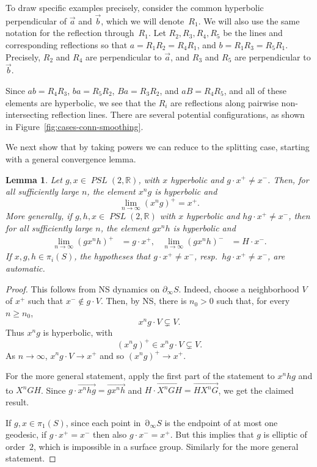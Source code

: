 \documentclass[11pt]{amsart}
\newcommand{\ora}[1]{\overrightarrow{#1}}
\numberwithin{equation}{section}
\numberwithin{figure}{section}
\newtheorem{lemma}[theorem]{Lemma}
\theoremstyle{definition}
\theoremstyle{plain}
\newcommand\bbR{\ensuremath{\mathbb{R}}}
\DeclareMathOperator{\bdy}{\partial}
\DeclareMathOperator{\PSL}{\mathit{PSL}}
\begin{document}
To draw specific examples precisely, consider the common hyperbolic perpendicular of $\ora{a}$
and $\ora{b}$, which we will denote~$R_1$. We will also use the
same notation for the reflection through~$R_1$.
Let $R_2, R_3, R_4, R_5$ be the lines and corresponding reflections so
that $a=R_1 R_2 = R_4 R_1$, and $b=R_1 R_3 = R_5 R_1$. Precisely,
$R_2$ and $R_4$ are perpendicular to $\ora{a}$, and $R_3$ and $R_5$
are perpendicular to $\ora{b}$.

Since
$ab=R_4 R_3$, $ba=R_5 R_2$, $Ba=R_3 R_2$, and $aB=R_4 R_5$, and all of
these elements are hyperbolic, we see
that the $R_i$ are reflections along pairwise non-intersecting reflection
lines. There are several potential configurations, as shown
in Figure~\ref{fig:cases-conn-smoothing}.

We next show that by taking powers we can reduce to the splitting
case, starting with a general convergence lemma.

\begin{lemma}
\label{lem:convergence_action}
Let $g,x \in \PSL(2,\mathbb{R})$, with $x$ hyperbolic and
$g \cdot x^+ \neq x^-$. Then, for all sufficiently large $n$,
the element $x^n g$ is hyperbolic and
\[
\lim_{n \to \infty} (x^n g)^+ = x^+ .
\]
More generally, if $g,h,x \in \PSL(2,\bbR)$ with $x$ hyperbolic and
$hg \cdot x^+ \ne x^-$, then for all sufficiently large $n$, the
element $g x^n h$ is hyperbolic and
\begin{align*}
  \lim_{n \to \infty} (g x^n h)^+ &= g \cdot x^+, &
  \lim_{n \to \infty} (g x^n h)^- &= H \cdot x^-.
\end{align*}
If $x,g,h \in \pi_i(S)$, the hypotheses that $g \cdot x^+ \ne x^-$,
resp.\ $hg \cdot x^+ \ne x^-$, are automatic.
\end{lemma}

\begin{proof}
This follows from NS dynamics on $\partial_\infty S$.
Indeed, choose a neighborhood $V$ of $x^+$ such that
$x^- \notin g \cdot V$. Then, by NS, there is
$n_0>0$ such that, for every $n \ge n_0$,
\[
x^n g \cdot V \subsetneq V.
\]
Thus $x^n g$ is hyperbolic, with
\[
(x^n g)^+ \in x^n g \cdot V \subsetneq V.
\]
As $n \to \infty$, $x^n g \cdot V \to x^+$ and so $(x^n g)^+ \to x^+$.

For the more general statement, apply the first part of the statement
to $x^n hg$ and to $X^n GH$. Since
$g \cdot \ora{x^n hg} = \ora{g x^n h}$ and $H \cdot \ora{X^n GH} =
\ora{H X^n G}$, we get the claimed result.

If $g,x \in \pi_1(S)$, since each point in $\bdy_\infty S$ is the
endpoint of at most one geodesic, if $g \cdot x^+ = x^-$ then also $g
\cdot x^- = x^+$. But this implies that $g$ is elliptic of order~$2$,
which is impossible in a surface group. Similarly for the more general
statement.
\end{proof}
\end{document}
